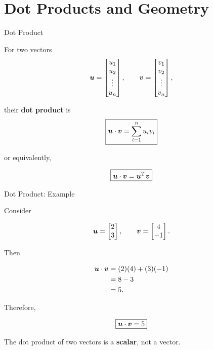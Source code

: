 

\section{Dot Products and Geometry}

\begin{frame}{Dot Product}

For two vectors
\[
\bm{u}
=
\begin{bmatrix}
u_1\\
u_2\\
\vdots\\
u_n
\end{bmatrix},
\qquad
\bm{v}
=
\begin{bmatrix}
v_1\\
v_2\\
\vdots\\
v_n
\end{bmatrix},
\]

their \textbf{dot product} is
\[
\boxed{
\bm{u}\cdot\bm{v}
=
\sum_{i=1}^{n}u_i v_i
}
\]

or equivalently,

\[
\boxed{
\bm{u}\cdot\bm{v}
=
\bm{u}^{T}\bm{v}
}
\]

\end{frame}



\begin{frame}{Dot Product: Example}

Consider

\[
\bm{u}
=
\begin{bmatrix}
2\\
3
\end{bmatrix},
\qquad
\bm{v}
=
\begin{bmatrix}
4\\
-1
\end{bmatrix}.
\]

Then

\[
\begin{aligned}
\bm{u}\cdot\bm{v}
&=
(2)(4)+(3)(-1)\\
&=8-3\\
&=5.
\end{aligned}
\]

Therefore,

\[
\boxed{\bm{u}\cdot\bm{v}=5}
\]

The dot product of two vectors is a \textbf{scalar}, not a vector.

\end{frame}


